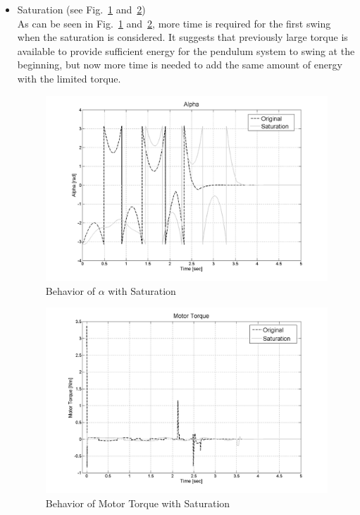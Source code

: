 \documentclass{article}
\theoremstyle{plain}
\theoremstyle{definition}
\theoremstyle{remark}
\begin{document}
\begin{itemize}
\item Saturation (see Fig.~\ref{fig:q10_s1} and~\ref{fig:q10_s2})\\
As can be seen in Fig.~\ref{fig:q10_s1} and~\ref{fig:q10_s2}, more time is required for the first swing when the saturation is considered. It suggests that previously large torque is available to provide sufficient energy for the pendulum system to swing at the beginning, but now more time is needed to add the same amount of energy with the limited torque.      

\begin{figure}[h]
\includegraphics[width=1\textwidth]{q10_s1.png}
\caption{Behavior of $\alpha$ with Saturation} \label{tex}
\label{fig:q10_s1}
\end{figure}
\begin{figure}[h]
\includegraphics[width=1\textwidth]{q10_s2.png}
\caption{Behavior of Motor Torque with Saturation} \label{tex}
\label{fig:q10_s2}
\end{figure}


\end{itemize}
\end{document}
